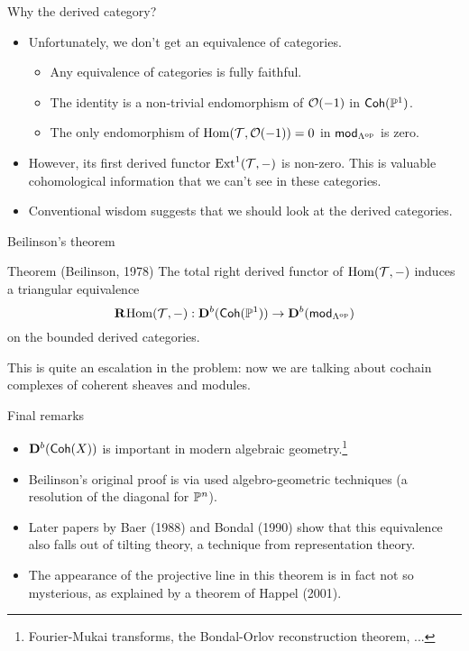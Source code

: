 \documentclass[
  xcolor=dvipsnames,
  aspectratio=169,
  compress
]{beamer}
\begin{document}
\begin{frame}{Why the derived category?}
  \begin{itemize}
    \item
      Unfortunately, we don't get an equivalence of categories.
      \pause
      \begin{itemize}
        \item
          Any equivalence of categories is fully faithful.

        \item
          The identity is a non-trivial endomorphism of $\twist{-1}$ in $\Coh(\proj{1})$.

        \item
          The only endomorphism of $\Hom(\shf{T}, \twist{-1}) = 0$ in $\mod{\op{\Lambda}}$ is zero.
      \end{itemize}

      \pause
    \item
      However, its first \alert{derived functor} $\Extalt{1}(\shf{T}, -)$ is non-zero.
      This is valuable cohomological information that we can't see in these categories.

      \pause
    \item
      Conventional wisdom suggests that we should look at the \alert{derived categories}.
  \end{itemize}
\end{frame}

\begin{frame}{Beilinson's theorem}
  \begin{block}{Theorem (Beilinson, 1978)}
    The \alert{total right derived functor} of $\Hom(\shf{T}, -)$ induces a triangular equivalence
    \[
      \derhom(\shf{T}, -): \dercat[b]{\Coh(\proj{1})} \to \dercat[b]{\mod{\op{\Lambda}}}
    \]
    on the bounded derived categories.
  \end{block}

  This is quite an escalation in the problem: now we are talking about \alert{cochain complexes} of coherent sheaves and modules.
\end{frame}

\begin{frame}{Final remarks}
  \begin{itemize}
    \item
      $\dercat[b]{\Coh(X)}$ is important in modern algebraic geometry.\footnote{Fourier-Mukai transforms, the Bondal-Orlov reconstruction theorem, ...}

    \item
      Beilinson's original proof is via used algebro-geometric techniques (a \alert{resolution of the diagonal} for $\proj{n}$).

    \item
      Later papers by Baer (1988) and Bondal (1990) show that this equivalence also falls out of \alert{tilting theory}, a technique from representation theory.

    \item
      The appearance of the projective line in this theorem is in fact not so mysterious, as explained by a theorem of Happel (2001).
  \end{itemize}
\end{frame}
\end{document}
